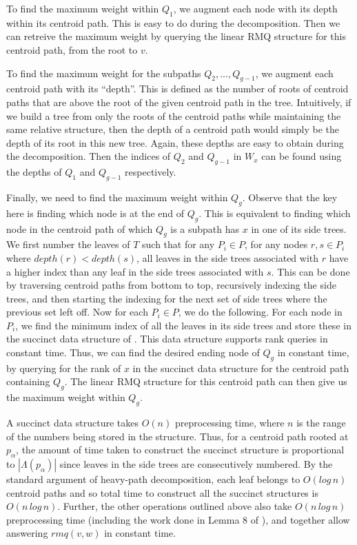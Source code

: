 \documentclass{article}
\newcommand{\leafset}{\Lambda}
\begin{document}
    To find the maximum weight within $Q_1$, we augment each node with its depth within its centroid path. This is easy to do during the decomposition. Then we can retreive the maximum weight by querying the linear RMQ structure for this centroid path, from the root to $v$.

    To find the maximum weight for the subpaths $Q_2, ..., Q_{g - 1}$, we augment each centroid path with its ``depth''. This is defined as the number of roots of centroid paths that are above the root of the given centroid path in the tree. Intuitively, if we build a tree from only the roots of the centroid paths while maintaining the same relative structure, then the depth of a centroid path would simply be the depth of its root in this new tree. Again, these depths are easy to obtain during the decomposition. Then the indices of $Q_2$ and $Q_{g-1}$ in $W_x$ can be found using the depths of $Q_1$ and $Q_{g - 1}$ respectively.

    Finally, we need to find the maximum weight within $Q_g$. Observe that the key here is finding which node is at the end of $Q_g$. This is equivalent to finding which node in the centroid path of which $Q_g$ is a subpath has $x$ in one of its side trees. We first number the leaves of $T$ such that for any $P_i \in P$, for any nodes $r, s \in P_i$ where $depth(r) < depth(s)$, all leaves in the side trees associated with $r$ have a higher index than any leaf in the side trees associated with $s$. This can be done by traversing centroid paths from bottom to top, recursively indexing the side trees, and then starting the indexing for the next set of side trees where the previous set left off. Now for each $P_i \in P$, we do the following. For each node in $P_i$, we find the minimum index of all the leaves in its side trees and store these in the succinct data structure of \cite{jacobson1988succinct}. This data structure supports rank queries in constant time. Thus, we can find the desired ending node of $Q_g$ in constant time, by querying for the rank of $x$ in the succinct data structure for the centroid path containing $Q_g$. The linear RMQ structure for this centroid path can then give us the maximum weight within $Q_g$.

    A succinct data structure takes $O(n)$ preprocessing time, where $n$ is the range of the numbers being stored in the structure. Thus, for a centroid path rooted at $p_{\alpha}$, the amount of time taken to construct the succinct structure is proportional to $|\leafset(p_{\alpha})|$ since leaves in the side trees are consecutively numbered. By the standard argument of heavy-path decomposition, each leaf belongs to $O(log\,n)$ centroid paths and so total time to construct all the succinct structures is $O(n\,log\,n)$. Further, the other operations outlined above also take $O(n\,log\,n)$ preprocessing time (including the work done in Lemma 8 of \cite{jansson2018algorithms}), and together allow answering $rmq(v, w)$ in constant time.
\end{document}
